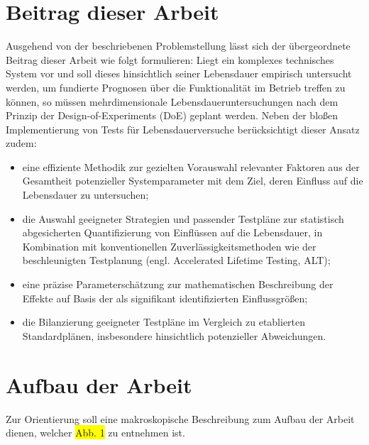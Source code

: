 \section{Beitrag dieser Arbeit}
Ausgehend von der beschriebenen Problemstellung lässt sich der übergeordnete Beitrag dieser Arbeit wie folgt formulieren: Liegt ein komplexes technisches System vor und soll dieses hinsichtlich seiner Lebensdauer empirisch untersucht werden, um fundierte Prognosen über die Funktionalität im Betrieb treffen zu können, so müssen mehrdimensionale Lebensdaueruntersuchungen nach dem Prinzip der Design-of-Experiments (\ac{DoE}) geplant werden.
Neben der bloßen Implementierung von Tests für Lebensdauerversuche berücksichtigt dieser Ansatz zudem:
\begin{itemize}
    \item eine effiziente Methodik zur gezielten Vorauswahl relevanter Faktoren aus der Gesamtheit potenzieller Systemparameter mit dem Ziel, deren Einfluss auf die Lebensdauer zu untersuchen;
    \item die Auswahl geeigneter Strategien und passender Testpläne zur statistisch abgesicherten Quantifizierung von Einflüssen auf die Lebensdauer, in Kombination mit konventionellen Zuverlässigkeitsmethoden wie der beschleunigten Testplanung (engl. Accelerated Lifetime Testing, ALT);
    \item eine präzise Parameterschätzung zur mathematischen Beschreibung der Effekte auf Basis der als signifikant identifizierten Einflussgrößen;
    \item die Bilanzierung geeigneter Testpläne im Vergleich zu etablierten Standardplänen, insbesondere hinsichtlich potenzieller Abweichungen.
\end{itemize}

\section{Aufbau der Arbeit}
Zur Orientierung soll eine makroskopische Beschreibung zum Aufbau der Arbeit dienen, welcher \colorbox{yellow}{Abb. 1} zu entnehmen ist.

